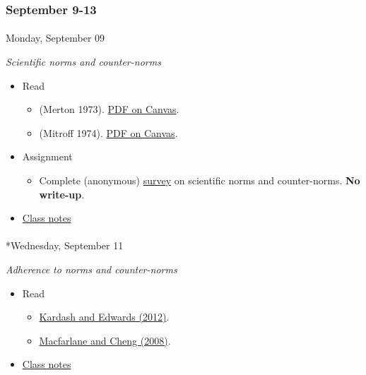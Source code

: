 \documentclass[
  letterpaper,
  DIV=11,
  numbers=noendperiod]{scrartcl}
\makeatletter
\let\oldparagraph\paragraph
\renewcommand{\paragraph}{
    \@ifstar
      \xxxParagraphStar
      \xxxParagraphNoStar
  }
\newcommand{\xxxParagraphStar}[1]{\oldparagraph*{#1}\mbox{}}
\newcommand{\xxxParagraphNoStar}[1]{\oldparagraph{#1}\mbox{}}
\providecommand{\tightlist}{%
  \setlength{\itemsep}{0pt}\setlength{\parskip}{0pt}}\usepackage{longtable,booktabs,array}
\makeatother
\begin{document}
\subsubsection*{September 9-13}\label{week-03}

\paragraph{Monday, September 09}\label{monday-september-09}

\emph{Scientific norms and counter-norms}

\begin{itemize}
\tightlist
\item
  Read

  \begin{itemize}
  \tightlist
  \item
    (Merton 1973).
    \href{https://psu.instructure.com/courses/2350148/files/folder/readings?preview=165170713}{PDF
    on Canvas}.
  \item
    (Mitroff 1974).
    \href{https://psu.instructure.com/courses/2350148/files/folder/readings?preview=165170712}{PDF
    on Canvas}.
  \end{itemize}
\item
  {Assignment}

  \begin{itemize}
  \tightlist
  \item
    Complete (anonymous)
    \href{https://forms.gle/reRw9sYUzsYHUsqz9}{survey} on scientific
    norms and counter-norms. \textbf{No write-up}.
  \end{itemize}
\item
  \href{notes/wk03-2024-09-09-norms-counternorms.qmd}{Class notes}
\end{itemize}

\paragraph*{Wednesday, September 11}\label{wednesday-september-11}

\emph{Adherence to norms and counter-norms}

\begin{itemize}
\tightlist
\item
  Read

  \begin{itemize}
  \tightlist
  \item
    \href{https://doi.org/10.1007/s11251-011-9195-0}{Kardash and Edwards
    (2012)}.
  \item
    \href{https://doi.org/10.1007/s10805-008-9055-y}{Macfarlane and
    Cheng (2008)}.
  \end{itemize}
\item
  \href{notes/wk03-2024-09-11-adherence-to-norms.qmd}{Class notes}
\end{itemize}
\end{document}
